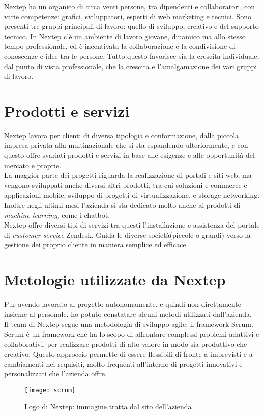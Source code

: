 Nextep ha un organico di circa venti persone, tra dipendenti e collaboratori, con
varie competenze: grafici, sviluppatori, esperti di web marketing e tecnici. Sono presenti
tre gruppi principali di lavoro: quello di sviluppo, creativo e del supporto
tecnico.
In Nextep c’è un ambiente di lavoro giovane, dinamico ma allo stesso tempo professionale,
ed è incentivata la collaborazione e la condivisione di conoscenze e idee
tra le persone. Tutto questo favorisce sia la crescita individuale, dal punto di vista
professionale, che la crescita e l’amalgamazione dei vari gruppi di lavoro.

\section{Prodotti e servizi}
Nextep lavora per clienti di diversa tipologia e conformazione, dalla piccola impresa
privata alla multinazionale che si sta espandendo ulteriormente, e con questo offre
svariati prodotti e servizi in base alle esigenze e alle opportunità del mercato e proprie. 
\\

La maggior parte dei progetti riguarda la realizzazione di portali e siti web, ma vengono
sviluppati anche diversi altri prodotti, tra cui soluzioni e-commerce e applicazioni
mobile, sviluppo di progetti di virtualizzazione, e storage networking. Inoltre negli ultimi mesi l'azienda si sta dedicato molto anche ai prodotti di \emph{machine learning}, come i chatbot. \\

Nextep offre diversi tipi di servizi tra questi l'installazione e assistenza del portale di \emph{customer service} Zendesk. Guida le diverse società(piccole o grandi) verso la gestione dei proprio cliente in maniera semplice ed efficace. 

\section{Metologie utilizzate da Nextep}
Pur avendo lavorato al progetto autonomamente, e quindi non direttamente insieme
al personale, ho potuto constatare alcuni metodi utilizzati
dall’azienda. 
\\
 
Il team di Nextep segue una metodologia di sviluppo agile: il framework Scrum.
Scrum è un framework che ha lo scopo di affrontare complessi problemi adattivi
e collaborativi, per realizzare prodotti di alto valore in modo sia produttivo che creativo.
Questo approccio permette di essere flessibili di fronte a imprevisti e a cambiamenti
nei requisiti, molto frequenti all’interno di progetti innovativi e personalizzati che
l’azienda offre.
\\
\begin{figure}[!h] 
	\centering 
	\texttt{[image: scrum]} 
	\caption{Logo di Nextep: immagine tratta dal sito dell’azienda}
\end{figure}



